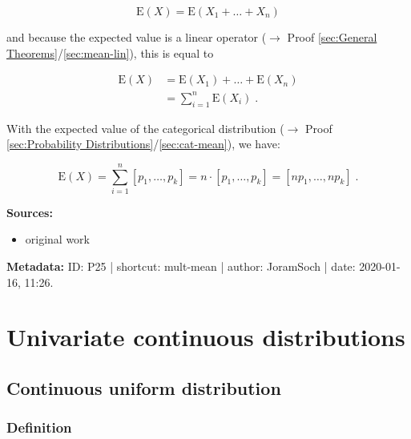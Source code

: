 \documentclass[a4paper,12pt,twoside]{book}
\begin{document}
\begin{equation} \label{eq:mult-mean-mult-mean-s1}
\mathrm{E}(X) = \mathrm{E}(X_1 + \ldots + X_n)
\end{equation}

and because the expected value is a linear operator ($\rightarrow$ Proof \ref{sec:General Theorems}/\ref{sec:mean-lin}), this is equal to

\begin{equation} \label{eq:mult-mean-mult-mean-s2}
\begin{split}
\mathrm{E}(X) &= \mathrm{E}(X_1) + \ldots + \mathrm{E}(X_n) \\
&= \sum_{i=1}^{n} \mathrm{E}(X_i) \; .
\end{split}
\end{equation}

With the expected value of the categorical distribution ($\rightarrow$ Proof \ref{sec:Probability Distributions}/\ref{sec:cat-mean}), we have:

\begin{equation} \label{eq:mult-mean-mult-mean-s3}
\mathrm{E}(X) = \sum_{i=1}^{n} \left[p_1, \ldots, p_k \right] = n \cdot \left[p_1, \ldots, p_k \right] = \left[n p_1, \ldots, n p_k \right] \; .
\end{equation}


\vspace{1em}
\textbf{Sources:}
\begin{itemize}
\item original work\end{itemize}


\vspace{1em}
\textbf{Metadata:} ID: P25 | shortcut: mult-mean | author: JoramSoch | date: 2020-01-16, 11:26.
\vspace{1em}



\pagebreak
\section{Univariate continuous distributions}

\subsection{Continuous uniform distribution}

\subsubsection[\textit{Definition}]{Definition} \label{sec:cuni}
\setcounter{equation}{0}
\end{document}
